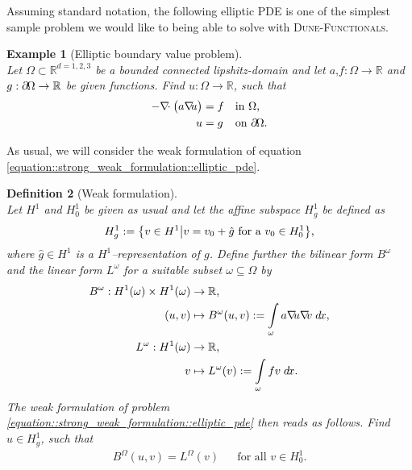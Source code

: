 \documentclass[a4paper,11pt]{article}
\numberwithin{equation}{section}
\newtheorem{definition}{Definition}[section]
\newtheorem{example}[definition]{Example}
\newcommand{\theoremNewline}{\hspace{1mm}\\}
\newcommand{\theoremEndLine}{\hspace{1mm}}
\newcommand{\dunefunctionals}{\textsc{Dune-Functionals}\xspace}
\newcommand{\hnS}{\hspace{-1.25pt}}
\newcommand{\divergence}{\nabla\hnS\hnS\hnS\cdot}
\newcommand{\gradient}{\nabla\hnS\hnS}
\newcommand{\boundary}{\partial \hnS}
\newcommand{\dx}{\;d\hnS x}
\newcommand{\komma}{\text{,}}
\newcommand{\punkt}{\text{.}}
\newcommand{\R}{\mathbb{R}}
\begin{document}
Assuming standard notation, the following elliptic PDE is one of the simplest sample problem we would like to being
able to solve with \dunefunctionals.

\begin{example}[Elliptic boundary value problem]\theoremNewline
	\label{example::strong_weak_formulation::elliptic_pde}
	Let ${\Omega \subset \R^{d=1,2,3}}$ be a bounded connected lipshitz-domain and let ${a\komma f : \Omega \rightarrow \R}$ and
	${g : \boundary\Omega \rightarrow \R}$ be given functions. Find ${u: \Omega \rightarrow \R}$, such that
	\begin{align}
		\label{equation::strong_weak_formulation::elliptic_pde}
		- \divergence
			\big(
				a \gradient u
			\big)
			&= f &&\text{in } \Omega \komma
		\\
		u &= g &&\text{on } \boundary\Omega \punkt
		\notag
	\end{align}
\end{example}\theoremEndLine

As usual, we will consider the weak formulation of equation \ref{equation::strong_weak_formulation::elliptic_pde}.

\begin{definition}[Weak formulation]\theoremNewline
	\label{definition::strong_weak_formulation::weak_formulation}
	Let $H^1$ and $H^1_0$ be given as usual and let the affine subspace $H^1_g$ be
	defined as
	\begin{align}
		H^1_g :=
			\big\{
				v \in H^1
			\big|
				v = v_0 + \hat{g} \text{ for a } v_0 \in H^1_0
			\big\}\komma
		\notag
	\end{align}
	where ${\hat{g} \in H^{1}}$ is a ${H^{1}}$--representation of $g$. Define further the bilinear form
	$B^{\omega}$ and the linear form
	$L^{\omega}$ for a suitable subset ${\omega \subseteq \Omega}$ by
	\begin{align}
		B^{\omega}: H^1(\omega) \times H^1(\omega) &\rightarrow \R \komma
			\notag\\
		(u,v) &\mapsto B^{\omega}(u,v) := \int\limits_{\omega} a \gradient u \gradient v \dx \komma
			\label{equation::strong_weak_formulation::bilinear_form}\\
		L^{\omega}: H^1(\omega) &\rightarrow \R \komma
			\notag\\
		v &\mapsto L^{\omega}(v) := \int\limits_{\omega} f v \dx \punkt
			\label{equation::strong_weak_formulation::linear_form}
	\end{align}
	The weak formulation of problem \eqref{equation::strong_weak_formulation::elliptic_pde} then reads as follows. Find
	${u \in H^1_g}$, such that
	\begin{align}
		\label{equation::strong_weak_formulation::weak_formulation}
		B^{\Omega}(u,v) = L^{\Omega}(v)
			&&\text{for all } v \in H^1_0 \punkt
	\end{align}
\end{definition}\theoremEndLine
\end{document}

